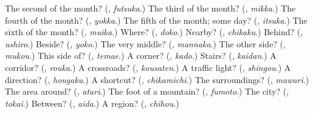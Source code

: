\begin{tcolorbox}[breakable,colback=teal!4,colframe=teal!35!black,title={Before you move on}]
The second of the month? (\textbf{}, \emph{futsuka}.) The third of the month? (\textbf{}, \emph{mikka}.) The fourth of the month? (\textbf{}, \emph{yokka}.) The fifth of the month; some day? (\textbf{}, \emph{itsuka}.) The sixth of the month? (\textbf{}, \emph{muika}.) Where? (\textbf{}, \emph{doko}.) Nearby? (\textbf{}, \emph{chikaku}.) Behind? (\textbf{}, \emph{ushiro}.) Beside? (\textbf{}, \emph{yoko}.) The very middle? (\textbf{}, \emph{mannaka}.) The other side? (\textbf{}, \emph{mukou}.) This side of? (\textbf{}, \emph{temae}.) A corner? (\textbf{}, \emph{kado}.) Stairs? (\textbf{}, \emph{kaidan}.) A corridor? (\textbf{}, \emph{rouka}.) A crossroads? (\textbf{}, \emph{kousaten}.) A traffic light? (\textbf{}, \emph{shingou}.) A direction? (\textbf{}, \emph{hougaku}.) A shortcut? (\textbf{}, \emph{chikamichi}.) The surroundings? (\textbf{}, \emph{mawari}.) The area around? (\textbf{}, \emph{atari}.) The foot of a mountain? (\textbf{}, \emph{fumoto}.) The city? (\textbf{}, \emph{tokai}.) Between? (\textbf{}, \emph{aida}.) A region? (\textbf{}, \emph{chihou}.)
\end{tcolorbox}
